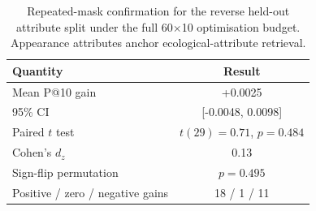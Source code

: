 \begin{table}
\centering
\caption{Repeated-mask confirmation for the reverse held-out attribute split under the full 60$\times$10 optimisation budget. Appearance attributes anchor ecological-attribute retrieval.}
\label{tab:heldout_reverse_validation_test}
\begin{tabular}{lc}
\toprule
Quantity & Result \\
\midrule
Mean P@10 gain & +0.0025 \\
95\% CI & [-0.0048, 0.0098] \\
Paired $t$ test & $t(29)=0.71$, $p=0.484$ \\
Cohen's $d_z$ & 0.13 \\
Sign-flip permutation & $p=0.495$ \\
Positive / zero / negative gains & 18 / 1 / 11 \\
\bottomrule
\end{tabular}
\end{table}
